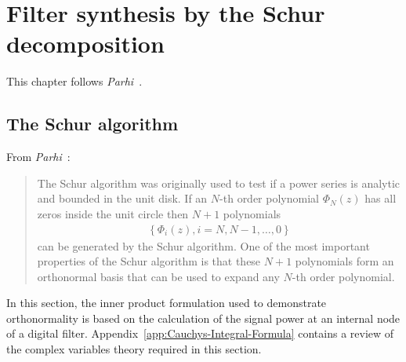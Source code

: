 \documentclass[a4paper,twoside,10pt,english]{report}
\begin{document}
\cleardoublepage{}
\chapter{\label{sec:Schur-decomposition}Filter synthesis by the Schur decomposition}
This chapter follows
\emph{Parhi}~\cite[Chapter 12]{Parhi_VLSIDigitalSignalProcessingSystems}.
\section{The Schur algorithm}
From \emph{Parhi}~\cite[Chapter 12]{Parhi_VLSIDigitalSignalProcessingSystems}:
\begin{quotation}
The Schur algorithm was originally used to test if a power series
is analytic and bounded in the unit disk. If an $N$-th order polynomial
$\Phi_{N}\left(z\right)$ has all zeros inside the unit circle then
$N+1$ polynomials
\begin{align*}
\left\{ \Phi_{i}\left(z\right),i=N,N-1,\ldots,0\right\} 
\end{align*}
can be generated by the Schur algorithm. One of the most important
properties of the Schur algorithm is that these $N+1$ polynomials
form an orthonormal basis that can be used to expand any $N$-th order
polynomial.
\end{quotation}
In this section, the inner product formulation used to demonstrate orthonormality
is based on the calculation of the signal power at an internal node
of a digital filter. Appendix~\ref{app:Cauchys-Integral-Formula}
contains a review of the complex variables theory required in this
section.
\end{document}
